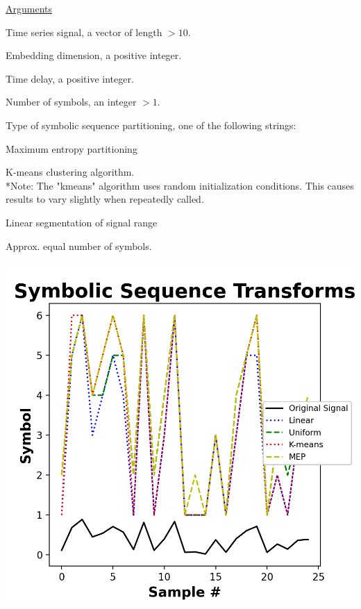 \documentclass[12pt, a4paper, titlepage, openany]{book}
\begin{document}
\noindent \ul{Arguments}
\begin{description}[labelsep=1cm, labelwidth=2cm, nosep, style=multiline,leftmargin=3cm]\footnotesize
\item[\texttt{Sig}]		Time series signal, a vector of length $> 10$.
\item[\texttt{m}]		Embedding dimension, a positive integer.
\item[\texttt{tau}]		Time delay, a positive integer.
\item[\texttt{c}]		Number of symbols, an integer $> 1$.
\item[\texttt{Typex}]	Type of symbolic sequence partitioning, one of the following strings:
	\begin{description}[labelsep=5em, labelwidth=8em, nosep,style=multiline,leftmargin=3cm]
		\item[\texttt{"MEP"}]	Maximum entropy partitioning \cite{SyDy2}		
		\item[\texttt{"kmeans"}] 	K-means clustering algorithm.\\
					*Note: The "kmeans" algorithm uses random initialization conditions.
		 			This causes results to vary slightly when repeatedly called.
		\item[\texttt{"linear"}]	Linear segmentation of signal range 
		\item[\texttt{"uniform"}]	Approx. equal number of symbols.
		\item[ ]				\includegraphics[scale=.75]{SyDy1.png}	\\
		

\end{description}
\end{description}
\end{document}
